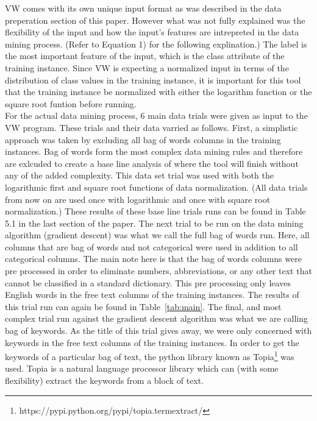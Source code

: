 VW comes with its own unique input format as was described in the data preperation section of this paper. However what was not fully
explained was the flexibility of the input and how the input's features are intrepreted in the data mining process. (Refer to Equation 1)
for the following explination.) The label is the most important feature of the input, which is the class attribute of the training
instance. Since VW is expecting a normalized input in terms of the distribution of class values in the training instance, it is important
for this tool that the training instance be normalized with either the logarithm function or the square root funtion before running.\\

For the actual data mining process, 6 main data trials were given as input to the VW program. These trials and their data varried as
follows. First, a simplistic approach was taken by excluding all bag of words columns in the training instances. Bag of words form
the most complex data mining rules and therefore are exlcuded to create a base line analysis of where the tool will finish without
any of the added complexity. This data set trial was used with both the logarithmic first and square root functions of data normalization.
(All data trials from now on are used once with logarithmic and once with square root normalization.) These results of these base line
trials runs can be found in Table 5.1 in the last section of the paper. The next trial to be run on the data mining algorithm (gradient
descent) was what we call the full bag of words run. Here, all columns that are bag of words and not categorical were used in addition
to all categorical columns. The main note here is that the bag of words columns were pre processed in order to eliminate numbers, 
abbreviations, or any other text that cannot be classified in a standard dictionary. This pre processing only leaves English words
in the free text columns of the training instances. The results of this trial run can again be found in Table~\ref{tab:main}. The 
final, and most complex trial run against the gradient descent algorithm was what we are calling bag of keywords. As the title of
this trial gives away, we were only concerned with keywords in the free text columns of the training instances. In order to
get the keywords of a particular bag of text, the python library known as Topia\footnote{https://pypi.python.org/pypi/topia.termextract/}
was used. Topia is a natural language processor library which can (with some flexibility) extract the keywords from a block of text.
